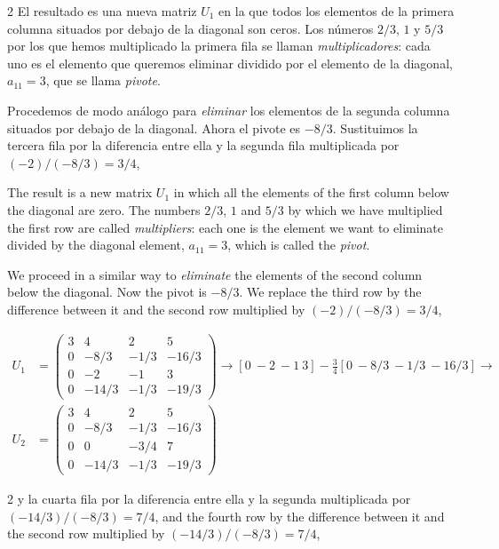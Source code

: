 \begin{paracol}{2}
El resultado es una nueva matriz $U_1$ en la que todos los elementos de la primera columna situados por debajo de la diagonal son ceros. Los números $2/3$, $1$ y $5/3$ por los que hemos multiplicado la primera fila se llaman \emph{multiplicadores}: cada uno es el elemento que queremos eliminar dividido por el elemento de la diagonal, $a_{11}=3$, que se llama \emph{pivote}.

Procedemos de modo análogo para \emph{eliminar} los elementos de la segunda columna situados por debajo de la diagonal. Ahora el pivote es $-8/3$. Sustituimos la tercera fila por la diferencia entre ella y la segunda fila multiplicada por $(-2)/(-8/3)=3/4$,

\switchcolumn

The result is a new matrix $U_1$ in which all the elements of the first column below the diagonal are zero. The numbers $2/3$, $1$ and $5/3$ by which we have multiplied the first row are called \emph{multipliers}: each one is the element we want to eliminate divided by the diagonal element, $a_{11}=3$, which is called the \emph{pivot}.

We proceed in a similar way to \emph{eliminate} the elements of the second column below the diagonal. Now the pivot is $-8/3$. We replace the third row by the difference between it and the second row multiplied by $(-2)/(-8/3)=3/4$,
\end{paracol}

\begin{align*}
U_1 &=\begin{pmatrix}
3& 4& 2&5\\
0& -8/3& -1/3& -16/3\\
0& -2& -1& 3\\
0& -14/3& -1/3& -19/3
\end{pmatrix} \rightarrow [0\ -2\ -1\ 3]-\frac{3}{4} [0\ -8/3\ -1/3\ -16/3] \rightarrow \\
 U_2 &=\begin{pmatrix}
3& 4& 2&5\\
0& -8/3& -1/3& -16/3\\
0& 0& -3/4& 7\\
0& -14/3& -1/3& -19/3
\end{pmatrix}
\end{align*}

\begin{paracol}{2}
y la cuarta fila por la diferencia entre ella y la segunda multiplicada por $(-14/3)/(-8/3)=7/4$,
\switchcolumn
and the fourth row by the difference between it and the second row multiplied by $(-14/3)/(-8/3)=7/4$,
\end{paracol}

